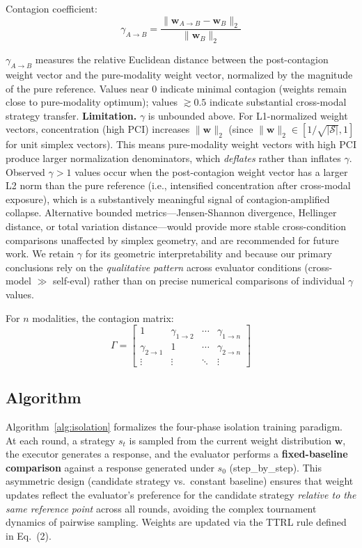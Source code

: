\documentclass[11pt,a4paper]{article}
\begin{document}
Contagion coefficient:
\begin{equation}
\gamma_{A\to B} = \frac{\|\mathbf{w}_{A\to B} - \mathbf{w}_B\|_2}{\|\mathbf{w}_B\|_2}
\end{equation}

$\gamma_{A\to B}$ measures the relative Euclidean distance between the post-contagion weight vector and the pure-modality weight vector, normalized by the magnitude of the pure reference. Values near 0 indicate minimal contagion (weights remain close to pure-modality optimum); values $\gtrsim 0.5$ indicate substantial cross-modal strategy transfer. \textbf{Limitation.} $\gamma$ is unbounded above. For L1-normalized weight vectors, concentration (high PCI) increases $\|\mathbf{w}\|_2$ (since $\|\mathbf{w}\|_2 \in [1/\sqrt{|\mathcal{S}|}, 1]$ for unit simplex vectors). This means pure-modality weight vectors with high PCI produce larger normalization denominators, which \textit{deflates} rather than inflates $\gamma$. Observed $\gamma > 1$ values occur when the post-contagion weight vector has a larger L2 norm than the pure reference (i.e., intensified concentration after cross-modal exposure), which is a substantively meaningful signal of contagion-amplified collapse. Alternative bounded metrics---Jensen-Shannon divergence, Hellinger distance, or total variation distance---would provide more stable cross-condition comparisons unaffected by simplex geometry, and are recommended for future work. We retain $\gamma$ for its geometric interpretability and because our primary conclusions rely on the \textit{qualitative pattern} across evaluator conditions (cross-model $\gg$ self-eval) rather than on precise numerical comparisons of individual $\gamma$ values.

For $n$ modalities, the contagion matrix:
\begin{equation}
\Gamma = \begin{bmatrix}
1 & \gamma_{1\to 2} & \cdots & \gamma_{1\to n} \\
\gamma_{2\to 1} & 1 & \cdots & \gamma_{2\to n} \\
\vdots & \vdots & \ddots & \vdots
\end{bmatrix}
\end{equation}

\subsection{Algorithm}

Algorithm~\ref{alg:isolation} formalizes the four-phase isolation training paradigm. At each round, a strategy $s_t$ is sampled from the current weight distribution $\mathbf{w}$, the executor generates a response, and the evaluator performs a \textbf{fixed-baseline comparison} against a response generated under $s_0$ (step\_by\_step). This asymmetric design (candidate strategy vs.\ constant baseline) ensures that weight updates reflect the evaluator's preference for the candidate strategy \textit{relative to the same reference point} across all rounds, avoiding the complex tournament dynamics of pairwise sampling. Weights are updated via the TTRL rule defined in Eq.~(2).
\end{document}
